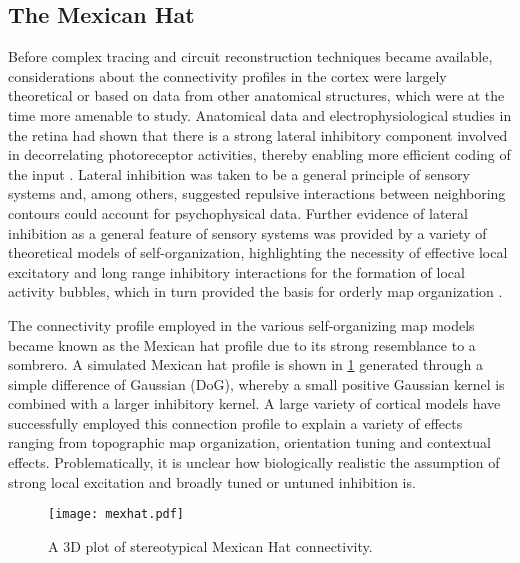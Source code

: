 \subsection{The Mexican Hat} \label{MexicanHat}


Before complex tracing and circuit reconstruction techniques became
available, considerations about the connectivity profiles in the
cortex were largely theoretical or based on data from other anatomical
structures, which were at the time more amenable to study. Anatomical
data and electrophysiological studies in the retina had shown that
there is a strong lateral inhibitory component involved in
decorrelating photoreceptor activities, thereby enabling more
efficient coding of the input \citep{Atick1992}. Lateral inhibition
was taken to be a general principle of sensory systems and, among
others, \cite{Blakemore1970} suggested repulsive interactions between
neighboring contours could account for psychophysical data. Further
evidence of lateral inhibition as a general feature of sensory systems
was provided by a variety of theoretical models of self-organization,
highlighting the necessity of effective local excitatory and long
range inhibitory interactions for the formation of local activity
bubbles, which in turn provided the basis for orderly map organization
\citep{VonderMalsburg1973,Miller1989}.

The connectivity profile employed in the various self-organizing map
models became known as the Mexican hat profile due to its strong
resemblance to a sombrero. A simulated Mexican hat profile is shown in
\ref{MexHat} generated through a simple difference of Gaussian (DoG),
whereby a small positive Gaussian kernel is combined with a larger
inhibitory kernel. A large variety of cortical models have
successfully employed this connection profile to explain a variety of
effects ranging from topographic map organization, orientation tuning
and contextual effects. Problematically, it is unclear how
biologically realistic the assumption of strong local excitation and
broadly tuned or untuned inhibition is.

\begin{figure}
	\centering \texttt{[image: mexhat.pdf]}
	\caption{A 3D plot of stereotypical Mexican Hat connectivity.}
	\label{MexHat}
\end{figure}

